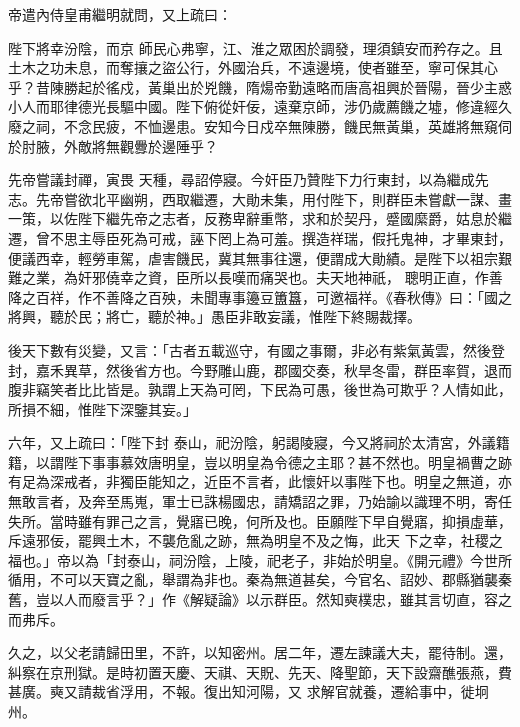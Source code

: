\begin{pinyinscope}
 帝遣內侍皇甫繼明就問，又上疏曰：



 陛下將幸汾陰，而京
 師民心弗寧，江、淮之眾困於調發，理須鎮安而矜存之。且土木之功未息，而奪攘之盜公行，外國治兵，不遠邊境，使者雖至，寧可保其心乎？昔陳勝起於徭戍，黃巢出於兇饑，隋煬帝勤遠略而唐高祖興於晉陽，晉少主惑小人而耶律德光長驅中國。陛下俯從奸佞，遠棄京師，涉仍歲薦饑之墟，修違經久廢之祠，不念民疲，不恤邊患。安知今日戍卒無陳勝，饑民無黃巢，英雄將無窺伺於肘腋，外敵將無觀釁於邊陲乎？



 先帝嘗議封禪，寅畏
 天種，尋詔停寢。今奸臣乃贊陛下力行東封，以為繼成先志。先帝嘗欲北平幽朔，西取繼遷，大勛未集，用付陛下，則群臣未嘗獻一謀、畫一策，以佐陛下繼先帝之志者，反務卑辭重幣，求和於契丹，蹙國縻爵，姑息於繼遷，曾不思主辱臣死為可戒，誣下罔上為可羞。撰造祥瑞，假托鬼神，才畢東封，便議西幸，輕勞車駕，虐害饑民，冀其無事往還，便謂成大勛績。是陛下以祖宗艱難之業，為奸邪僥幸之資，臣所以長嘆而痛哭也。夫天地神祇，
 聰明正直，作善降之百祥，作不善降之百殃，未聞專事籩豆簠簋，可邀福祥。《春秋傳》曰：「國之將興，聽於民；將亡，聽於神。」愚臣非敢妄議，惟陛下終賜裁擇。



 後天下數有災變，又言：「古者五載巡守，有國之事爾，非必有紫氣黃雲，然後登封，嘉禾異草，然後省方也。今野雕山鹿，郡國交奏，秋旱冬雷，群臣率賀，退而腹非竊笑者比比皆是。孰謂上天為可罔，下民為可愚，後世為可欺乎？人情如此，所損不細，惟陛下深鑒其妄。」



 六年，又上疏曰：「陛下封
 泰山，祀汾陰，躬謁陵寢，今又將祠於太清宮，外議籍籍，以謂陛下事事慕效唐明皇，豈以明皇為令德之主耶？甚不然也。明皇禍曹之跡有足為深戒者，非獨臣能知之，近臣不言者，此懷奸以事陛下也。明皇之無道，亦無敢言者，及奔至馬嵬，軍士已誅楊國忠，請矯詔之罪，乃始諭以識理不明，寄任失所。當時雖有罪己之言，覺寤已晚，何所及也。臣願陛下早自覺寤，抑損虛華，斥遠邪佞，罷興土木，不襲危亂之跡，無為明皇不及之悔，此天
 下之幸，社稷之福也。」帝以為「封泰山，祠汾陰，上陵，祀老子，非始於明皇。《開元禮》今世所循用，不可以天寶之亂，舉謂為非也。秦為無道甚矣，今官名、詔妙、郡縣猶襲秦舊，豈以人而廢言乎？」作《解疑論》以示群臣。然知奭樸忠，雖其言切直，容之而弗斥。



 久之，以父老請歸田里，不許，以知密州。居二年，遷左諫議大夫，罷待制。還，糾察在京刑獄。是時初置天慶、天祺、天貺、先天、降聖節，天下設齋醮張燕，費甚廣。奭又請裁省浮用，不報。復出知河陽，又
 求解官就養，遷給事中，徙坰州。




\end{pinyinscope}

